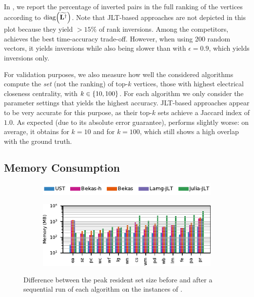 In , we report the percentage of inverted
pairs in the full ranking of the vertices according to $\diag{\Linvapx}$.
Note that JLT-based approaches are not depicted in this plot because they
yield $>15\%$ of rank inversions. Among the competitors, \bekas achieves the
best time-accuracy trade-off. However, when using 200 random vectors, it yields
\bekasRanking inversions while also being \ustBekasSpeedup slower than \ust
with $\epsilon = 0.9$, which yields \ustRanking inversions only.

For validation purposes, we also measure how well the considered algorithms
compute the \emph{set} (not the ranking) of top-$k$ vertices, \ie those with
highest electrical closeness centrality, with $k\in \set{10, 100}$. For each
algorithm we only consider the parameter settings that yields the highest
accuracy. JLT-based approaches appear to be very accurate for this purpose, as
their top-$k$ sets achieve a Jaccard index of $1.0$. As expected (due to its
absolute error guarantee), \ust performs slightly worse: on average, it obtains
 for $k = 10$ and  for $k = 100$, which still
shows a high overlap with the ground truth.

\subsection{Memory Consumption}
\begin{figure}[tb]
\centering
\begin{subfigure}{\textwidth}
\centering
\includegraphics{sources/plots/el-clos/legend-memory-consumption.pdf}
\end{subfigure}

\begin{subfigure}{.6\textwidth}
\centering
\includegraphics[width=\textwidth]{sources/plots/el-clos/memory-consumption.pdf}
\end{subfigure}
\caption{Difference between the peak resident set size before and after
a sequential run of each algorithm on the instances of
.}
\label{fig:el-clos:memory}
\end{figure}

